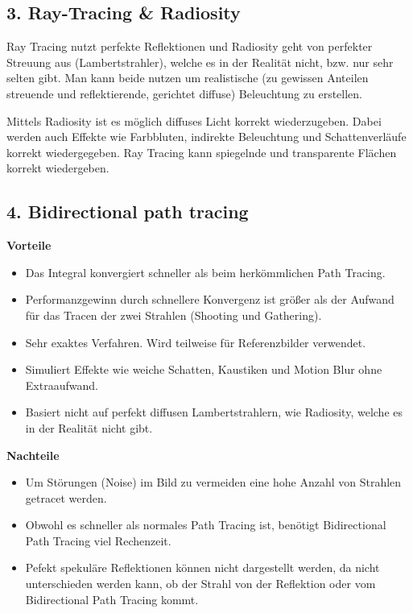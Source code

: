 \documentclass[a4paper,headings=small]{scrartcl}
\numberwithin{equation}{section} %
\numberwithin{figure}{section}   %
\begin{document}
\subsection*{3. Ray-Tracing \& Radiosity}

Ray Tracing nutzt perfekte Reflektionen und Radiosity geht von perfekter Streuung aus (Lambertstrahler), welche es in der Realität nicht, bzw. nur sehr selten gibt.
Man kann beide nutzen um realistische (zu gewissen Anteilen streuende und reflektierende, gerichtet diffuse) Beleuchtung zu erstellen.

Mittels Radiosity ist es möglich diffuses Licht korrekt wiederzugeben. Dabei werden auch Effekte wie Farbbluten, indirekte Beleuchtung und Schattenverläufe korrekt wiedergegeben. Ray Tracing kann spiegelnde und transparente Flächen korrekt wiedergeben.


\subsection*{4. Bidirectional path tracing}

\textbf{Vorteile}
\begin{itemize}
\item Das Integral konvergiert schneller als beim herkömmlichen Path Tracing.
\item Performanzgewinn durch schnellere Konvergenz ist größer als der Aufwand für das Tracen der zwei Strahlen (Shooting und Gathering).
\item Sehr exaktes Verfahren. Wird teilweise für Referenzbilder verwendet.
\item Simuliert Effekte wie weiche Schatten, Kaustiken und Motion Blur ohne Extraaufwand.
\item Basiert nicht auf perfekt diffusen Lambertstrahlern, wie Radiosity, welche es in der Realität nicht gibt.
\end{itemize}

\textbf{Nachteile}
\begin{itemize}
\item Um Störungen (Noise) im Bild zu vermeiden eine hohe Anzahl von Strahlen getracet werden.
\item Obwohl es schneller als normales Path Tracing ist, benötigt Bidirectional Path Tracing viel Rechenzeit.
\item Pefekt spekuläre Reflektionen können nicht dargestellt werden, da nicht unterschieden werden kann, ob der Strahl von der Reflektion oder vom Bidirectional Path Tracing kommt.
\end{itemize}
\end{document}
